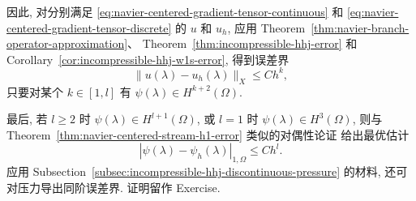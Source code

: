 因此, 对分别满足 \eqref{eq:navier-centered-gradient-tensor-continuous} 和
\eqref{eq:navier-centered-gradient-tensor-discrete} 的 $u$ 和 $u_h$,
应用 Theorem~\ref{thm:navier-branch-operator-approximation}、
Theorem~\ref{thm:incompressible-hhj-error} 和
Corollary~\ref{cor:incompressible-hhj-w1s-error}, 得到误差界
\[
\|u(\lambda)-u_h(\lambda)\|_X\leq Ch^k,
\]
只要对某个 $k\in[1,l]$ 有 $\psi(\lambda)\in H^{k+2}(\Omega)$.

最后, 若 $l\geq2$ 时 $\psi(\lambda)\in H^{l+1}(\Omega)$,
或 $l=1$ 时 $\psi(\lambda)\in H^3(\Omega)$,
则与 Theorem~\ref{thm:navier-centered-stream-h1-error} 类似的对偶性论证
给出最优估计
\[
|\psi(\lambda)-\psi_h(\lambda)|_{1,\Omega}\leq Ch^l.
\]
应用 Subsection~\ref{subsec:incompressible-hhj-discontinuous-pressure} 的材料,
还可对压力导出同阶误差界. 证明留作 Exercise.
